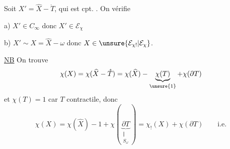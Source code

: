 
Soit $X'=\widehat X-\mathring T$, qui est cpt. . On vérifie


a) $X'\in C_\infty$ donc $X'\in\mathcal E_\chi$

b) $X'\sim X=\widehat X-\omega$ donc $X\in\unsure{\mathcal E_{\chi!}|\mathcal E_\chi}$.

\uline{NB} On trouve
\[
\chi(X)=\chi(\widehat X-\mathring T)=\chi(\widehat X)-\underbrace{\chi(T)}_{\unsure{1}}+\chi(\partial T)
\]
et $\chi(T)=1$ car $T$ contractile, donc
\[
\chi(X)=\chi(\widehat X)-1+\chi(\underbrace{\partial T}_{\substack{\Vert\\S_\omega}})=\chi_!(X)+\chi(\partial T)\qquad\text{i.e.}
\]

